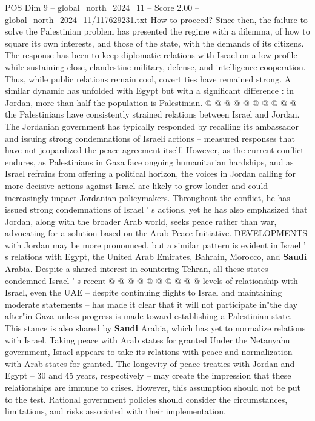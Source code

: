 \begin{textsample}{POS Dim 9 – global\_north\_2024\_11 – Score 2.00 – global\_north\_2024\_11/117629231.txt}
How to proceed?
Since then, the failure to solve the Palestinian problem has presented the regime with a dilemma, of how to square its own interests, and those of the state, with the demands of its citizens.
The response has been to keep diplomatic relations with Israel on a low-profile while sustaining close, clandestine military, defense, and intelligence cooperation.
Thus, while public relations remain cool, covert ties have remained strong.
A similar dynamic has unfolded with Egypt but with a significant difference : in Jordan, more than half the population is Palestinian. @ @ @ @ @ @ @ @ @ @ the Palestinians have consistently strained relations between Israel and Jordan.
The Jordanian government has typically responded by recalling its ambassador and issuing strong condemnations of Israeli actions -- measured responses that have not jeopardized the peace agreement itself.
However, as the current conflict endures, as Palestinians in Gaza face ongoing humanitarian hardships, and as Israel refrains from offering a political horizon, the voices in Jordan calling for more decisive actions against Israel are likely to grow louder and could increasingly impact Jordanian policymakers.
Throughout the conflict, he has issued strong condemnations of Israel ' s actions, yet he has also emphasized that Jordan, along with the broader Arab world, seeks peace rather than war, advocating for a solution based on the Arab Peace Initiative.
DEVELOPMENTS with Jordan may be more pronounced, but a similar pattern is evident in Israel ' s relations with Egypt, the United Arab Emirates, Bahrain, Morocco, and \textbf{Saudi} Arabia.
Despite a shared interest in countering Tehran, all these states condemned Israel ' s recent @ @ @ @ @ @ @ @ @ @ levels of relationship with Israel, even the UAE -- despite continuing flights to Israel and maintaining moderate statements -- has made it clear that it will not participate in"the day after"in Gaza unless progress is made toward establishing a Palestinian state.
This stance is also shared by \textbf{Saudi} Arabia, which has yet to normalize relations with Israel.
Taking peace with Arab states for granted Under the Netanyahu government, Israel appears to take its relations with peace and normalization with Arab states for granted.
The longevity of peace treaties with Jordan and Egypt -- 30 and 45 years, respectively -- may create the impression that these relationships are immune to crises.
However, this assumption should not be put to the test.
Rational government policies should consider the circumstances, limitations, and risks associated with their implementation.

\end{textsample}
